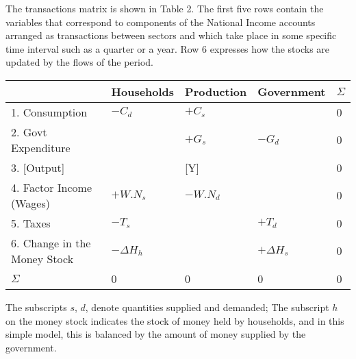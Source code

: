 \documentclass[twoside,a4paper,11pt]{article}
\begin{document}
The transactions matrix is shown in Table 2. The first five rows contain the variables that correspond to components of the National Income accounts arranged as transactions between sectors and which take place in some specific time interval such as a quarter or a year. Row 6 expresses how the stocks are updated by the flows of the period.
\begin{center}
\begin{tabular}{lllll}
\hline
& Households & Production & Government & $\Sigma$ \\
\hline
1. Consumption & $-C_d$ & $+C_s$ &  & 0 \\
2. Govt Expenditure &  & $+G_s$ & $-G_d$  & 0 \\
3. [Output] &  & [Y] &  & 0 \\
4. Factor Income (Wages)  & $+W.N_s$ & $-W.N_d$ &   & 0 \\
5. Taxes & $-T_s$ &  & $+T_d$  & 0 \\
6. Change in the Money Stock & $-\Delta H_h$ &  & $+\Delta H_s$   & 0 \\
\hline
$\Sigma$  & 0 & 0 & 0 & 0 \\
\hline
\end{tabular}
\end{center}

The subscripts $s$, $d$, denote quantities supplied and demanded; The subscript $h$ on the money stock indicates the stock of money held by households, and in this simple model, this is balanced by the amount of money supplied by the government.
\end{document}
